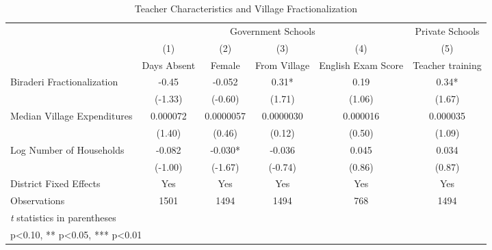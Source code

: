 \begin{sidewaystable}[htbp]\centering
\def\sym#1{\ifmmode^{#1}\else\(^{#1}\)\fi}
\caption{Teacher Characteristics and Village Fractionalization\label{teachers}}
\begin{tabular}{l*{5}{c}}
\toprule
                &\multicolumn{4}{c}{Government Schools}             &\multicolumn{1}{c}{Private Schools}\\\cmidrule(lr){2-5}\cmidrule(lr){6-6}
                &\multicolumn{1}{c}{(1)}&\multicolumn{1}{c}{(2)}&\multicolumn{1}{c}{(3)}&\multicolumn{1}{c}{(4)}&\multicolumn{1}{c}{(5)}\\
                &\multicolumn{1}{c}{Days Absent}&\multicolumn{1}{c}{Female}&\multicolumn{1}{c}{From Village}&\multicolumn{1}{c}{English Exam Score}&\multicolumn{1}{c}{Teacher training}\\
\midrule
Biraderi Fractionalization&    -0.45   &   -0.052   &     0.31*  &     0.19   &     0.34*  \\
                &  (-1.33)   &  (-0.60)   &   (1.71)   &   (1.06)   &   (1.67)   \\
Median Village Expenditures& 0.000072   &0.0000057   &0.0000030   & 0.000016   & 0.000035   \\
                &   (1.40)   &   (0.46)   &   (0.12)   &   (0.50)   &   (1.09)   \\
Log Number of Households&   -0.082   &   -0.030*  &   -0.036   &    0.045   &    0.034   \\
                &  (-1.00)   &  (-1.67)   &  (-0.74)   &   (0.86)   &   (0.87)   \\
District Fixed Effects&      Yes   &      Yes   &      Yes   &      Yes   &      Yes   \\
\midrule
Observations    &     1501   &     1494   &     1494   &      768   &     1494   \\
\bottomrule
\multicolumn{6}{l}{\footnotesize \textit{t} statistics in parentheses}\\
\multicolumn{6}{l}{\footnotesize * p<0.10, ** p<0.05, *** p<0.01}\\
\end{tabular}
\end{sidewaystable}
